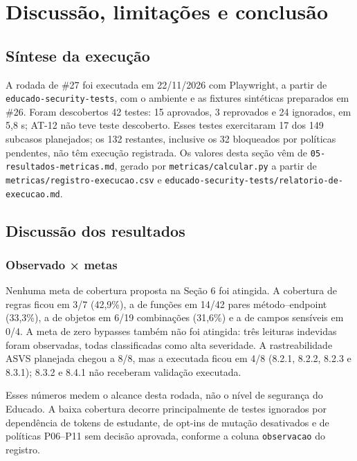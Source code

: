 \section{Discussão, limitações e
conclusão}\label{discussuxe3o-limitauxe7uxf5es-e-conclusuxe3o}

\subsection{Síntese da execução}\label{suxedntese-da-execuuxe7uxe3o}

A rodada de \#27 foi executada em 22/11/2026 com Playwright, a partir de
\texttt{educado-security-tests}, com o ambiente e as fixtures sintéticas
preparados em \#26. Foram descobertos 42 testes: 15 aprovados, 3
reprovados e 24 ignorados, em 5,8 s; AT-12 não teve teste descoberto.
Esses testes exercitaram 17 dos 149 subcasos planejados; os 132
restantes, inclusive os 32 bloqueados por políticas pendentes, não têm
execução registrada. Os valores desta seção vêm de
\texttt{05-resultados-metricas.md}, gerado por
\texttt{metricas/\allowbreak{}calcular.py} a partir de
\texttt{metricas/\allowbreak{}registro-execucao.csv} e
\texttt{educado-security-tests/\allowbreak{}relatorio-de-execucao.md}.

\subsection{Discussão dos resultados}\label{discussuxe3o-dos-resultados}

\subsubsection{Observado × metas}\label{observado-metas}

Nenhuma meta de cobertura proposta na Seção 6 foi atingida. A cobertura
de regras ficou em 3/7 (42,9\%), a de funções em 14/42 pares
método--endpoint (33,3\%), a de objetos em 6/19 combinações (31,6\%) e a
de campos sensíveis em 0/4. A meta de zero bypasses também não foi
atingida: três leituras indevidas foram observadas, todas classificadas
como alta severidade. A rastreabilidade ASVS planejada chegou a 8/8, mas
a executada ficou em 4/8 (8.2.1, 8.2.2, 8.2.3 e 8.3.1); 8.3.2 e 8.4.1
não receberam validação executada.

Esses números medem o alcance desta rodada, não o nível de segurança do
Educado. A baixa cobertura decorre principalmente de testes ignorados
por dependência de tokens de estudante, de opt-ins de mutação
desativados e de políticas P06--P11 sem decisão aprovada, conforme a
coluna \texttt{observacao} do registro.

